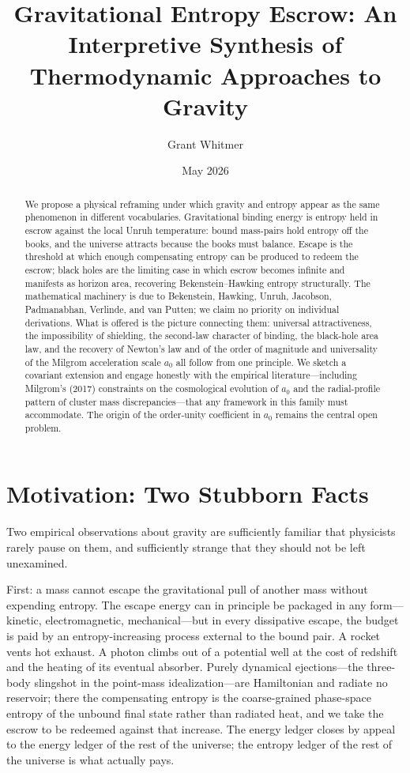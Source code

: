 \documentclass[11pt]{article}
\title{Gravitational Entropy Escrow: An Interpretive Synthesis of Thermodynamic Approaches to Gravity}
\author{Grant Whitmer}
\date{May 2026}
\begin{document}
\maketitle
\begin{abstract}
We propose a physical reframing under which gravity and entropy appear as the same phenomenon in different vocabularies. Gravitational binding energy is entropy held in escrow against the local Unruh temperature: bound mass-pairs hold entropy off the books, and the universe attracts because the books must balance. Escape is the threshold at which enough compensating entropy can be produced to redeem the escrow; black holes are the limiting case in which escrow becomes infinite and manifests as horizon area, recovering Bekenstein--Hawking entropy structurally. The mathematical machinery is due to Bekenstein, Hawking, Unruh, Jacobson, Padmanabhan, Verlinde, and van Putten; we claim no priority on individual derivations. What is offered is the picture connecting them: universal attractiveness, the impossibility of shielding, the second-law character of binding, the black-hole area law, and the recovery of Newton's law and of the order of magnitude and universality of the Milgrom acceleration scale $a_0$ all follow from one principle. We sketch a covariant extension and engage honestly with the empirical literature---including Milgrom's (2017) constraints on the cosmological evolution of $a_0$ and the radial-profile pattern of cluster mass discrepancies---that any framework in this family must accommodate. The origin of the order-unity coefficient in $a_0$ remains the central open problem.
\end{abstract}
\section{Motivation: Two Stubborn Facts}\label{motivation-two-stubborn-facts}

Two empirical observations about gravity are sufficiently familiar that physicists rarely pause on them, and sufficiently strange that they should not be left unexamined.

First: a mass cannot escape the gravitational pull of another mass without expending entropy. The escape energy can in principle be packaged in any form---kinetic, electromagnetic, mechanical---but in every dissipative escape, the budget is paid by an entropy-increasing process external to the bound pair. A rocket vents hot exhaust. A photon climbs out of a potential well at the cost of redshift and the heating of its eventual absorber. Purely dynamical ejections---the three-body slingshot in the point-mass idealization---are Hamiltonian and radiate no reservoir; there the compensating entropy is the coarse-grained phase-space entropy of the unbound final state rather than radiated heat, and we take the escrow to be redeemed against that increase. The energy ledger closes by appeal to the energy ledger of the rest of the universe; the entropy ledger of the rest of the universe is what actually pays.
\end{document}
